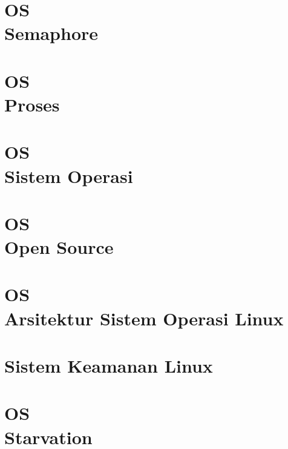 \documentclass{wileySix}
\begin{document}
%

	
\chapter[OS Semaphore]
{OS\\ Semaphore}


\chapter[Proses OS]
{OS\\ Proses}


%

\chapter[Sistem Operasi]
{OS\\ Sistem Operasi}


\chapter[Open Sourcei]
{OS\\ Open Source}


\chapter[Linux]
{OS\\ Arsitektur Sistem Operasi Linux}


\chapter[Sistem Keamanan Linux]
{Sistem Keamanan Linux}


\chapter[Starvation]
{OS\\ Starvation}

\end{document}
